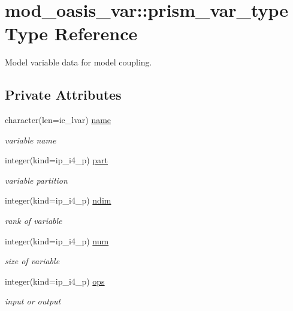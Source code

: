 \hypertarget{structmod__oasis__var_1_1prism__var__type}{}\section{mod\+\_\+oasis\+\_\+var\+:\+:prism\+\_\+var\+\_\+type Type Reference}
\label{structmod__oasis__var_1_1prism__var__type}


Model variable data for model coupling.  


\subsection*{Private Attributes}
\begin{DoxyCompactItemize}
\item 
character(len=ic\+\_\+lvar) \hyperlink{structmod__oasis__var_1_1prism__var__type_a90fb2c4252337f674bd4e3dc29c02f6b}{name}
\begin{DoxyCompactList}\small\item\em variable name \end{DoxyCompactList}\item 
integer(kind=ip\+\_\+i4\+\_\+p) \hyperlink{structmod__oasis__var_1_1prism__var__type_a370ca8fd795e1d832bdcce52705e8f0c}{part}
\begin{DoxyCompactList}\small\item\em variable partition \end{DoxyCompactList}\item 
integer(kind=ip\+\_\+i4\+\_\+p) \hyperlink{structmod__oasis__var_1_1prism__var__type_a21345a842b0dfd5dcf4a00c2356035da}{ndim}
\begin{DoxyCompactList}\small\item\em rank of variable \end{DoxyCompactList}\item 
integer(kind=ip\+\_\+i4\+\_\+p) \hyperlink{structmod__oasis__var_1_1prism__var__type_a717aa9d5848cee514dcaf036936c8f1b}{num}
\begin{DoxyCompactList}\small\item\em size of variable \end{DoxyCompactList}\item 
integer(kind=ip\+\_\+i4\+\_\+p) \hyperlink{structmod__oasis__var_1_1prism__var__type_a9235132dc1d3cf0b89211c09dcc62fa2}{ops}
\begin{DoxyCompactList}\small\item\em input or output \end{DoxyCompactList}\item 

\end{DoxyCompactItemize}
